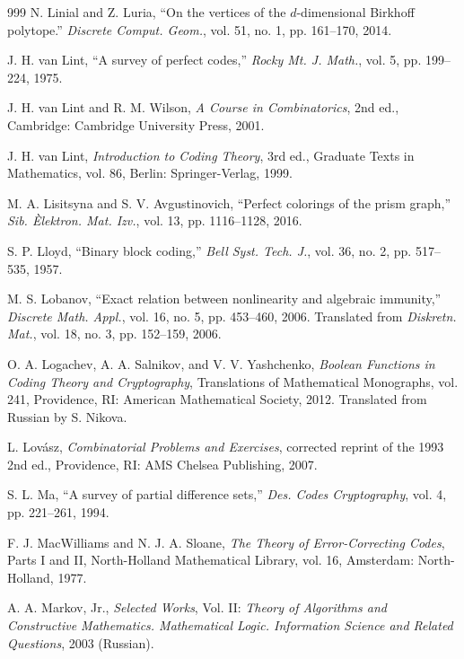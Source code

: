 \documentclass[11pt]{article}
\theoremstyle{definition}
\begin{document}
{{{\begin{thebibliography}{999}
N. Linial and Z. Luria, 
``On the vertices of the {{\(d\)}}-dimensional {Birkhoff} polytope.''
\textit{Discrete Comput. Geom.}, vol. 51, no. 1, pp. 161--170, 2014.


J. H. van Lint,
``A survey of perfect codes,''
\textit{Rocky Mt. J. Math.}, vol. 5, pp. 199--224, 1975.

J. H. van Lint and R. M. Wilson,
\textit{A Course in Combinatorics}, 2nd ed.,
Cambridge: Cambridge University Press, 2001.

J. H. van Lint,
\textit{Introduction to Coding Theory}, 3rd ed.,
Graduate Texts in Mathematics, vol. 86,
Berlin: Springer-Verlag, 1999.

M. A. Lisitsyna and S. V. Avgustinovich,
``Perfect colorings of the prism graph,''
\textit{Sib. Èlektron. Mat. Izv.}, vol. 13, pp. 1116--1128, 2016.

S. P. Lloyd,
``Binary block coding,''
\textit{Bell Syst. Tech. J.}, vol. 36, no. 2, pp. 517--535, 1957.

M. S. Lobanov,
``Exact relation between nonlinearity and algebraic immunity,''
\textit{Discrete Math. Appl.}, vol. 16, no. 5, pp. 453--460, 2006.
Translated from \textit{Diskretn. Mat.}, vol. 18, no. 3, pp. 152--159, 2006.

O. A. Logachev, A. A. Salnikov, and V. V. Yashchenko,
\textit{Boolean Functions in Coding Theory and Cryptography},
Translations of Mathematical Monographs, vol. 241,
Providence, RI: American Mathematical Society, 2012.
Translated from Russian by S. Nikova.

L. Lovász,
\textit{Combinatorial Problems and Exercises},
corrected reprint of the 1993 2nd ed.,
Providence, RI: AMS Chelsea Publishing, 2007.

S. L. Ma,
``A survey of partial difference sets,''
\textit{Des. Codes Cryptography}, vol. 4, pp. 221--261, 1994.

F. J. MacWilliams and N. J. A. Sloane,
\textit{The Theory of Error-Correcting Codes}, Parts I and II,
North-Holland Mathematical Library, vol. 16,
Amsterdam: North-Holland, 1977.




A. A. Markov, Jr.,
\textit{Selected Works}, Vol. II:
\textit{Theory of Algorithms and Constructive Mathematics. Mathematical Logic. Information Science and Related Questions},
2003 (Russian).


\end{thebibliography}}}}
\end{document}
